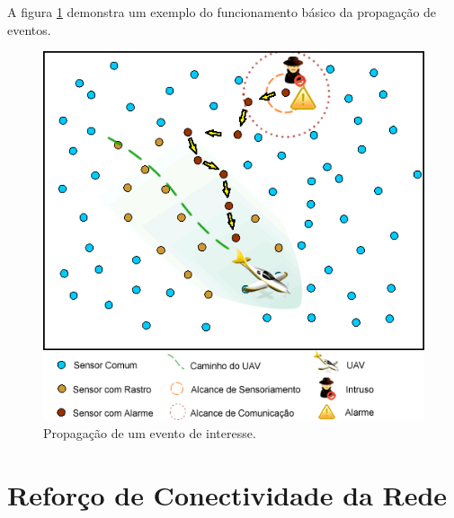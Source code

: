  A figura \ref{fig:app} demonstra um exemplo do funcionamento básico da propagação de eventos.
 
 \begin{figure}[h!]
 \centering
 \includegraphics[width=12cm]{pictures/application.png}
 \caption{Propagação de um evento de interesse.}
  \label{fig:app}
 \end{figure}

\section{Reforço de Conectividade da Rede}





